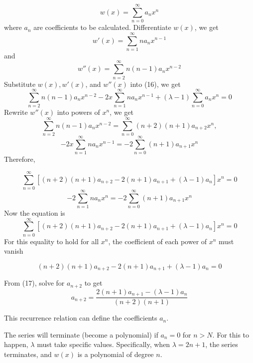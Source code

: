 \documentclass[a4paper,12pt]{report}
\begin{document}
\[w(x) = \sum_{n=0}^\infty a_n x^n\]
where \(a_n\) are coefficients to be calculated. Differentiate \(w(x)\), we get
\[w'(x) = \sum_{n=1}^\infty n a_n x^{n-1}\]
and
\[w''(x) = \sum_{n=2}^\infty n(n-1) a_n x^{n-2}\]
Substitute \(w(x), w'(x)\), and \(w''(x)\) into (16), we get
\[\sum_{n=2}^\infty n(n-1)a_nx^{n-2} - 2x\sum_{n=1}^\infty n a_n x^{n-1} + (\lambda - 1)\sum_{n=0}^\infty a_n x^n = 0\]
Rewrite \(w''(x)\) into powers of \(x^n\), we get
\[\sum_{n=2}^\infty n(n-1)a_nx^{n-2} = \sum_{n=0}^\infty (n+2)(n+1)a_{n+2}x^n,\]
\[-2x\sum_{n=1}^\infty n a_n x^{n-1} = -2\sum_{n=0}^\infty (n+1)a_{n+1}x^n\]
Therefore, 

\[\sum_{n=0}^\infty \left[(n+2)(n+1)a_{n+2} - 2(n+1)a_{n+1} + (\lambda - 1)a_n \right]x^n = 0\]
\[-2\sum_{n=1}^\infty n a_n x^n = -2\sum_{n=0}^\infty (n+1)a_{n+1}x^n\]
Now the equation is
\[\sum_{n=0}^\infty \left[(n+2)(n+1)a_{n+2} - 2(n+1)a_{n+1} + (\lambda - 1)a_n \right]x^n = 0\]
For this equality to hold for all \(x^n\), the coefficient of each power of \(x^n\) must vanish

\[(n+2)(n+1)a_{n+2} - 2(n+1)a_{n+1} + (\lambda - 1)a_n = 0 \tag{17}\]

From (17), solve for \(a_{n+2}\) to get
\[a_{n+2} = \frac{2(n+1)a_{n+1} - (\lambda - 1)a_n}{(n+2)(n+1)} \tag{18}\]

This recurrence relation can define the coefficients \(a_n\).

The series will terminate (become a polynomial) if \(a_n = 0\) for \(n > N\). For this to happen, \(\lambda\) must take specific values. Specifically, when \(\lambda = 2n + 1\), the series terminates, and \(w(x)\) is a polynomial of degree \(n\).
\end{document}
